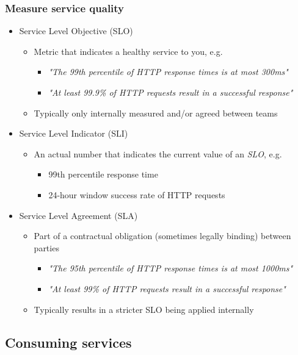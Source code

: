 \documentclass[8pt]{article}
\begin{document}
\subsubsection{Measure service quality}
\label{sec:org11d8584}
\begin{itemize}
\item Service Level Objective (SLO)
\begin{itemize}
\item Metric that indicates a healthy service to you, e.g.
\begin{itemize}
\item \emph{"The 99th percentile of HTTP response times is at most 300ms"}
\item \emph{"At least 99.9\% of HTTP requests result in a successful response"}
\end{itemize}
\item Typically only internally measured and/or agreed between teams
\end{itemize}

\item Service Level Indicator (SLI)
\begin{itemize}
\item An actual number that indicates the current value of an \emph{SLO}, e.g.
\begin{itemize}
\item 99th percentile response time
\item 24-hour window success rate of HTTP requests
\end{itemize}
\end{itemize}

\item Service Level Agreement (SLA)
\begin{itemize}
\item Part of a contractual obligation (sometimes legally binding) between parties
\begin{itemize}
\item \emph{"The 95th percentile of HTTP response times is at most 1000ms"}
\item \emph{"At least 99\% of HTTP requests result in a successful response"}
\end{itemize}
\item Typically results in a stricter SLO being applied internally
\end{itemize}
\end{itemize}
\subsection{Consuming services}
\label{sec:org85d17e7}
\end{document}
